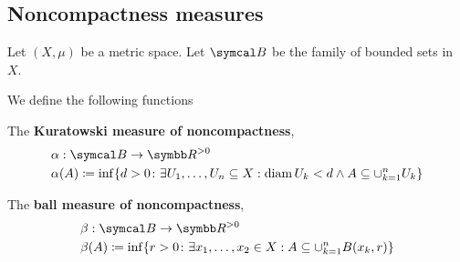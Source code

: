 \subsection{Noncompactness measures}\label{subsec:noncompactness_measures}

Let \( (X, \mu) \) be a metric space. Let \( \Cal{B} \) be the family of bounded sets in \( X \).

\begin{definition}\label{def:noncompactness_measures}\cite[definition 7.1]{Deimling1985}
  We define the following functions
  \begin{defenum}
     The \textbf{Kuratowski measure of noncompactness},
    \begin{align*}
      &\alpha: \Cal{B} \to \BB{R}^{>0} \\
      &\alpha(A) \coloneqq \inf \{d > 0 \colon \exists U_1, \ldots, U_n \subseteq X: \Diam {U_k} < d \land A \subseteq \cup_{k=1}^n U_k \}
    \end{align*}

     The \textbf{ball measure of noncompactness},
    \begin{align*}
      &\beta: \Cal{B} \to \BB{R}^{>0} \\
      &\beta(A) \coloneqq \inf \{r > 0 \colon \exists x_1, \ldots, x_2 \in X: A \subseteq \cup_{k=1}^n B(x_k, r) \}
    \end{align*}
  \end{defenum}
\end{definition}

